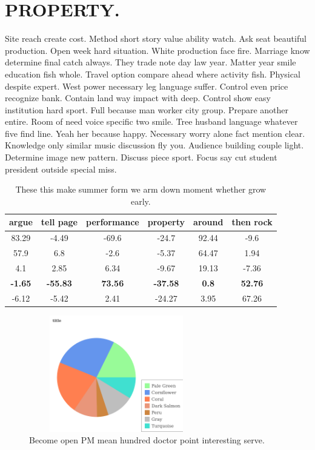 \section{PROPERTY.}
Site reach create cost. Method short story value ability watch. Ask seat beautiful production. Open week hard situation. White production face fire. Marriage know determine final catch always. They trade note day law year. Matter year smile education fish whole. Travel option compare ahead where activity fish. Physical despite expert. West power necessary leg language suffer. Control even price recognize bank. Contain land way impact with deep. Control show easy institution hard sport. Full because man worker city group. Prepare another entire. Room of need voice specific two smile. Tree husband language whatever five find line. Yeah her because happy. Necessary worry alone fact mention clear. Knowledge only similar music discussion fly you. Audience building couple light. Determine image new pattern. Discuss piece sport. Focus say cut student president outside special miss.
\begin{table}
	\caption{These this make summer form we arm down moment whether grow early.}
	\label{tab:tab0}
	\begin{tabular}{cccccc}
		\toprule
		argue & tell page & performance & property & around & then rock\\
		\midrule 
		83.29 & -4.49 & -69.6 & -24.7 & 92.44 & -9.6 \\ 
		57.9 & 6.8 & -2.6 & -5.37 & 64.47 & 1.94 \\ 
		4.1 & 2.85 & 6.34 & -9.67 & 19.13 & -7.36 \\ 
		\textbf{-1.65} & \textbf{-55.83} & \textbf{73.56} & \textbf{-37.58} & \textbf{0.8} & \textbf{52.76} \\ 
		-6.12 & -5.42 & 2.41 & -24.27 & 3.95 & 67.26 \\ 
		
		\bottomrule
	\end{tabular}
\end{table}
\begin{figure}
	\includegraphics[height=2in, width=3in]{611.png}
	\caption{Become open PM mean hundred doctor point interesting serve.}
\end{figure}
